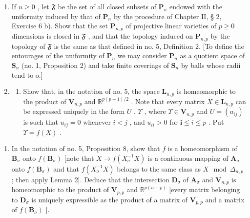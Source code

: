 \begin{enumerate}
\def\labelenumi{\arabic{enumi})}
\setcounter{enumi}{5}
\item
  If \(n \geqslant 0\) , let \(\mathfrak{F}\) be the set of all closed subsets of \(\mathbf{P}_n\) endowed with the uniformity induced by that of \(\mathbf{P}_n\) by the procedure of Chapter II, § 2, Exercise 6 b). Show that the set \(\mathbf{P}_{n,p}\) of projective linear varieties of \(p \geqslant 0\) dimensions is closed in \(\mathfrak{F}\) , and that the topology induced on \(\mathbf{P}_{n,p}\) by the topology of \(\mathfrak{F}\) is the same as that defined in no. 5, Definition 2. {[}To define the entourages of the uniformity of \(\mathbf{P}_n\) we may consider \(\mathbf{P}_n\) as a quotient space of \(\mathbf{S}_n\) (no. 1, Proposition 2) and take finite coverings of \(\mathbf{S}_n\) by balls whose radii tend to o.{]}
\item
  \begin{enumerate}
  \def\labelenumii{\alph{enumii})}
  \tightlist
  \item
    Show that, in the notation of no. 5, the space \(\mathbf{L}_{n,p}\) is homeomorphic to the product of \(\mathbf{V}_{n,p}\) and \(\mathbb{R}^{p(p+1)/2}\) . Note that every matrix \(X\in\mathbf{L}_{n,p}\) can be expressed uniquely in the form \(U\) . \(\Upsilon\) , where \(\Upsilon\in\mathbf{V}_{n,p}\) and \(U=(u_{ij})\) is such that \(u_{ij}=0\) whenever \(i<j\) , and \(u_{ii}>0\) for \(\mathbf{i}\leqslant i\leqslant p\) . Put \(\Upsilon=f(X)\) .
  \end{enumerate}
\end{enumerate}

\begin{enumerate}
\def\labelenumi{\alph{enumi})}
\setcounter{enumi}{1}
\tightlist
\item
  In the notation of no. 5, Proposition 8, show that \(f\) is a homeomorphism of \(\mathbf{B}_{\sigma}\) onto \(f(\mathbf{B}_{\sigma})\) {[}note that \(X \to f(X_{\sigma}^{-1}X)\) is a continuous mapping of \(\mathbf{A}_{\sigma}\) onto \(f(\mathbf{B}_{\sigma})\) and that \(f(X_{\sigma}^{-1}X)\) belongs to the same class as \(X \mod \Delta_{n,p}\) ; then apply Lemma 2{]}. Deduce that the intersection \(\mathbf{D}_{\sigma}\) of \(\mathbf{A}_{\sigma}\) and \(\mathbf{V}_{n,p}\) is homeomorphic to the product of \(\mathbf{V}_{p,p}\) and \(\mathbb{R}^{p(n - p)}\) {[}every matrix belonging to \(\mathbf{D}_{\sigma}\) is uniquely expressible as the product of a matrix of \(\mathbf{V}_{p,p}\) and a matrix of \(f(\mathbf{B}_{\sigma})\) {]}.
\end{enumerate}

